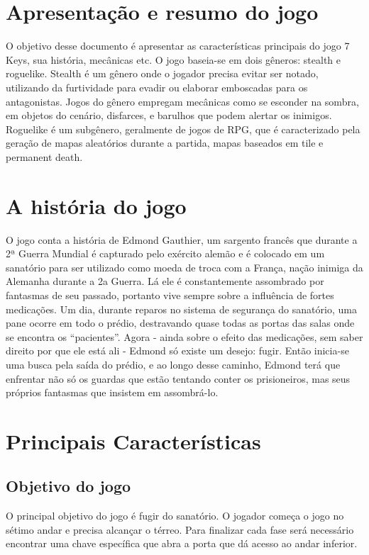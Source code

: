 \documentclass[12pt]{article}
\begin{document}

\section{Apresentação e resumo do jogo}
     O objetivo desse documento é apresentar as características principais do jogo 7 Keys, sua história, mecânicas etc.
     O jogo baseia-se em dois gêneros: stealth e roguelike. Stealth é um gênero onde o jogador precisa evitar ser notado, utilizando da furtividade para evadir ou elaborar emboscadas para os antagonistas. Jogos do gênero empregam mecânicas como se esconder na sombra, em objetos do cenário, disfarces, e barulhos que podem alertar os inimigos. Roguelike é um subgênero, geralmente de jogos de RPG, que é caracterizado pela geração de mapas aleatórios durante a partida, mapas baseados em tile e permanent death.

\section{A história do jogo}
    O jogo conta a história de Edmond Gauthier, um sargento francês que durante a 2ª Guerra Mundial é capturado pelo exército alemão e é colocado em um sanatório para ser utilizado como moeda de troca com a França, nação inimiga da Alemanha durante a 2a Guerra. Lá ele é constantemente assombrado por fantasmas de seu passado, portanto vive sempre sobre a influência de fortes medicações. 
    Um dia, durante reparos no sistema de segurança do sanatório, uma pane ocorre em todo o prédio, destravando quase todas as portas das salas onde se encontra os “pacientes”. Agora - ainda sobre o efeito das medicações, sem saber direito por que ele está ali -  Edmond só existe um desejo: fugir. Então inicia-se uma busca pela saída do prédio, e ao longo desse caminho, Edmond terá que enfrentar não só os guardas que estão tentando conter os prisioneiros, mas seus próprios fantasmas que insistem em assombrá-lo.
    
\section{Principais Características}
\subsection{Objetivo do jogo}
O principal objetivo do jogo é fugir do sanatório. O jogador começa o jogo no sétimo andar e precisa alcançar o térreo. Para finalizar cada fase será necessário encontrar uma chave específica que abra a porta que dá acesso ao andar inferior.
\end{document}
